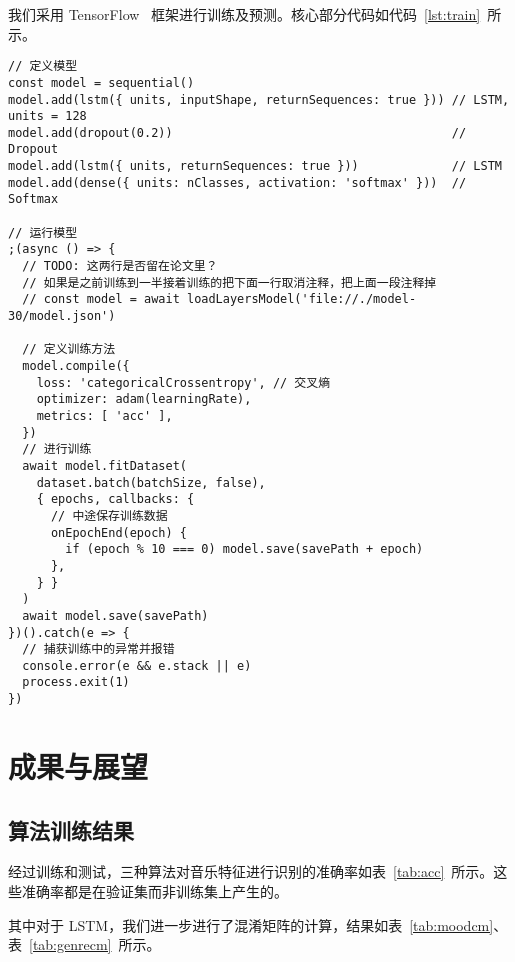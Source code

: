 \documentclass[a4paper,utf8,10pt]{article}
\begin{document}
\noindent 我们采用 TensorFlow~\cite{tf15} 框架进行训练及预测。核心部分代码如代码~\ref{lst:train}~所示。
 \label{lst:train}
\begin{verbatim}
// 定义模型
const model = sequential()
model.add(lstm({ units, inputShape, returnSequences: true })) // LSTM, units = 128
model.add(dropout(0.2))                                       // Dropout
model.add(lstm({ units, returnSequences: true }))             // LSTM
model.add(dense({ units: nClasses, activation: 'softmax' }))  // Softmax

// 运行模型
;(async () => {
  // TODO: 这两行是否留在论文里？
  // 如果是之前训练到一半接着训练的把下面一行取消注释，把上面一段注释掉
  // const model = await loadLayersModel('file://./model-30/model.json')

  // 定义训练方法
  model.compile({
    loss: 'categoricalCrossentropy', // 交叉熵
    optimizer: adam(learningRate),
    metrics: [ 'acc' ],
  })
  // 进行训练
  await model.fitDataset(
    dataset.batch(batchSize, false),
    { epochs, callbacks: {
      // 中途保存训练数据
      onEpochEnd(epoch) {
        if (epoch % 10 === 0) model.save(savePath + epoch)
      },
    } }
  )
  await model.save(savePath)
})().catch(e => {
  // 捕获训练中的异常并报错
  console.error(e && e.stack || e)
  process.exit(1)
})
\end{verbatim}

\section{成果与展望}
\subsection{算法训练结果}

经过训练和测试，三种算法对音乐特征进行识别的准确率如表~\ref{tab:acc}~所示。这些准确率都是在验证集而非训练集上产生的。

其中对于 LSTM，我们进一步进行了混淆矩阵的计算，结果如表~\ref{tab:moodcm}、表~\ref{tab:genrecm}~所示。
\end{document}
